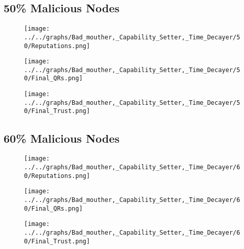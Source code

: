 \begin{minipage}[t]{0.49\columnwidth}
\subsection*{50\% Malicious Nodes}
    \begin{figure}[H]
        \centering
        \texttt{[image: ../../graphs/Bad\_mouther,\_Capability\_Setter,\_Time\_Decayer/50/Reputations.png]}
    \end{figure}
    \begin{figure}[H]
        \centering
        \texttt{[image: ../../graphs/Bad\_mouther,\_Capability\_Setter,\_Time\_Decayer/50/Final\_QRs.png]}
    \end{figure}
\end{minipage}
\begin{minipage}[t]{0.49\columnwidth}
    \begin{figure}[H]
        \centering
        \texttt{[image: ../../graphs/Bad\_mouther,\_Capability\_Setter,\_Time\_Decayer/50/Final\_Trust.png]}
    \end{figure}
\end{minipage}

\begin{minipage}[t]{0.49\columnwidth}
\subsection*{60\% Malicious Nodes}
    \begin{figure}[H]
        \centering
        \texttt{[image: ../../graphs/Bad\_mouther,\_Capability\_Setter,\_Time\_Decayer/60/Reputations.png]}
    \end{figure}
    \begin{figure}[H]
        \centering
        \texttt{[image: ../../graphs/Bad\_mouther,\_Capability\_Setter,\_Time\_Decayer/60/Final\_QRs.png]}
    \end{figure}
\end{minipage}
\begin{minipage}[t]{0.49\columnwidth}
    \begin{figure}[H]
        \centering
        \texttt{[image: ../../graphs/Bad\_mouther,\_Capability\_Setter,\_Time\_Decayer/60/Final\_Trust.png]}
    \end{figure}
\end{minipage}

